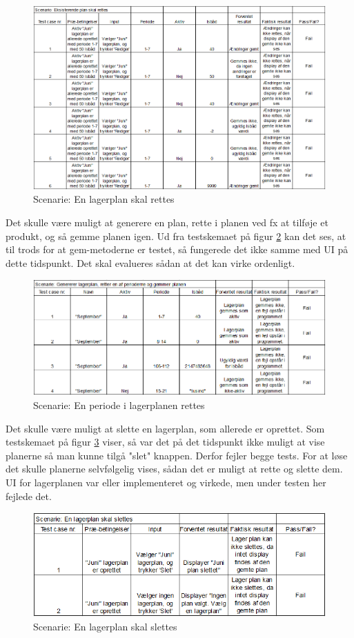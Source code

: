 \begin{figure}[p]
    \centering
    \includegraphics[width=0.8\hsize]{figures/tests/edit_existing_plan.png}
    \caption{Scenarie: En lagerplan skal rettes}
    \label{fig:testedit}
\end{figure}

Det skulle være muligt at generere en plan, rette i planen ved fx at tilføje et produkt, og så gemme planen igen. Ud fra testskemaet på figur \ref{fig:testeditperiod} kan det ses, at til trods for at gem-metoderne er testet, så fungerede det ikke samme med UI på dette tidspunkt. Det skal evalueres sådan at det kan virke ordenligt.

\begin{figure}[p]
    \centering
    \includegraphics[width=0.8\hsize]{figures/tests/test_ret_plan.png}
    \caption{Scenarie: En periode i lagerplanen rettes}
    \label{fig:testeditperiod}
\end{figure}

Det skulle være muligt at slette en lagerplan, som allerede er oprettet. Som testskemaet på figur \ref{fig:testdelete} viser, så var det på det tidspunkt ikke muligt at vise planerne så man kunne tilgå "slet" knappen. Derfor fejler begge tests. For at løse det skulle planerne selvfølgelig vises, sådan det er muligt at rette og slette dem. UI for lagerplanen var eller implementeret og virkede, men under testen her fejlede det.

\begin{figure}[p]
    \centering
    \includegraphics[width=0.8\hsize]{figures/tests/test_slet_lagerplan.png}
    \caption{Scenarie: En lagerplan skal slettes}
    \label{fig:testdelete}
\end{figure}





